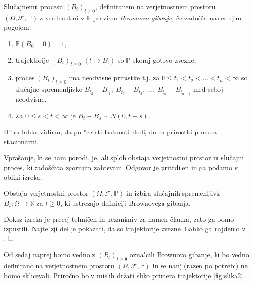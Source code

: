 \documentclass[twoside,11pt]{article}
\begin{document}
\pagebreak

\begin{definicija}
    Slučajnemu procesu $(B_t)_{t\geq 0}$, definiranem na verjetnostnem prostoru $(\Omega, \mathcal{F}, \mathbb{P})$
    z vrednostmi v $\mathbb{R}$ pravimo \textit{Brownovo gibanje}, če 
    zadošča naslednjim pogojem:
    \begin{enumerate}
        \item $\mathbb{P}(B_0 = 0) = 1$,
        \item trajektorije $(B_t)_{t\geq0}$ $(t \mapsto B_t)$ so $\mathbb{P}$-skoraj gotovo zvezne,
        \item proces $\left(B_t\right)_{t \geq 0}$ ima neodvisne prirastke t.j. za $0 \leq t_1 < t_2 < \ldots < t_n < \infty$ so slučajne spremenljivke
            $B_{t_2} - B_{t_1}, \ B_{t_3} - B_{t_2}, \ \ldots, \ B_{t_n} - B_{t_{n-1}}$ med seboj neodvisne. 
        \item Za $ 0 \leq s < t < \infty$ je $B_t - B_s \sim N(0, t-s)$.
    \end{enumerate}
\end{definicija}

\begin{opomba}
    Hitro lahko vidimo, da po "cetrti lastnosti sledi, da so prirastki procesa stacionarni.
\end{opomba}

Vprašanje, ki se nam porodi, je, ali sploh obstaja verjetnostni prostor 
in slučajni proces, ki zadoščata zgornjim zahtevam. Odgovor je pritrdilen in ga 
podamo v obliki izreka.

\begin{izrek}
    Obstaja verjetnostni prostor $(\Omega, \mathcal{F}, \mathbb{P})$ in
    izbira slučajnih spremenljivk $B_t : \Omega \to \mathbb{R}$ za $t \geq 0$,
    ki ustrezajo definiciji Brownovega gibanja.
\end{izrek}

\begin{dokaz}
    Dokaz izreka je precej tehničen in nezanimiv za namen članka, zato ga bomo izpustili. Najte"zji del je 
    pokazati, da so trajektorije zvezne. Lahko ga najdemo v \cite{1}. $\hfill \square$
\end{dokaz}


Od sedaj naprej bomo vedno z $(B_t)_{t\geq 0}$ ozna"cili Brownovo gibanje, ki bo vedno definirano na 
verjetnostnem prostoru $(\Omega, \mathcal{F}, \mathbb{P})$ in se nanj (razen po potrebi) ne 
bomo sklicevali. Priročno bo v mislih držati sliko primera trajektorije  \ref{fig:slika2}.
\end{document}

